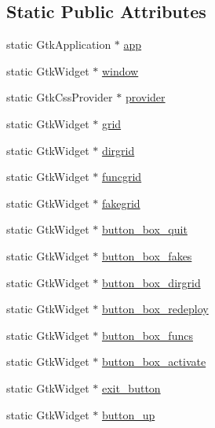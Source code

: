 \subsection*{Static Public Attributes}
\begin{DoxyCompactItemize}
\item 
static Gtk\+Application $\ast$ \hyperlink{classgtk__class_ae45e5712c6b5c5f0fa42a60aaff9f936}{app}
\item 
static Gtk\+Widget $\ast$ \hyperlink{classgtk__class_aa3947dc5d9f91482508977971c1a7ca2}{window}
\item 
static Gtk\+Css\+Provider $\ast$ \hyperlink{classgtk__class_a51f72983ecaccf83bb79d3d441754951}{provider}
\item 
static Gtk\+Widget $\ast$ \hyperlink{classgtk__class_aba5ba60ac9d62d3821667c89d12511fc}{grid}
\item 
static Gtk\+Widget $\ast$ \hyperlink{classgtk__class_a7fc243eec0ab61cdd6021c5f635dd40b}{dirgrid}
\item 
static Gtk\+Widget $\ast$ \hyperlink{classgtk__class_abd69dffa09078b21b628725bf1733682}{funcgrid}
\item 
static Gtk\+Widget $\ast$ \hyperlink{classgtk__class_a44907d6d72a937b0c3b6ab571e13533a}{fakegrid}
\item 
static Gtk\+Widget $\ast$ \hyperlink{classgtk__class_a291f7b187718826e0da79375375fe03f}{button\+\_\+box\+\_\+quit}
\item 
static Gtk\+Widget $\ast$ \hyperlink{classgtk__class_a4816355ec87898c40b8a3a450c7a0a75}{button\+\_\+box\+\_\+fakes}
\item 
static Gtk\+Widget $\ast$ \hyperlink{classgtk__class_aa310a332eba52f28d8819f1d419c3ca7}{button\+\_\+box\+\_\+dirgrid}
\item 
static Gtk\+Widget $\ast$ \hyperlink{classgtk__class_ab3c5243bcab4bc09a167737dd86c9cde}{button\+\_\+box\+\_\+redeploy}
\item 
static Gtk\+Widget $\ast$ \hyperlink{classgtk__class_a7bf2f4eb78eacf4c63f8eb5b59576e20}{button\+\_\+box\+\_\+funcs}
\item 
static Gtk\+Widget $\ast$ \hyperlink{classgtk__class_a0234a576c91f5d8999260eac4b6968b7}{button\+\_\+box\+\_\+activate}
\item 
static Gtk\+Widget $\ast$ \hyperlink{classgtk__class_aa6d7ef2e235a1b86782298fba1e191fa}{exit\+\_\+button}
\item 
static Gtk\+Widget $\ast$ \hyperlink{classgtk__class_aabb26f9d552a0a7e1177ec74feb838ff}{button\+\_\+up}
\item 

\end{DoxyCompactItemize}
